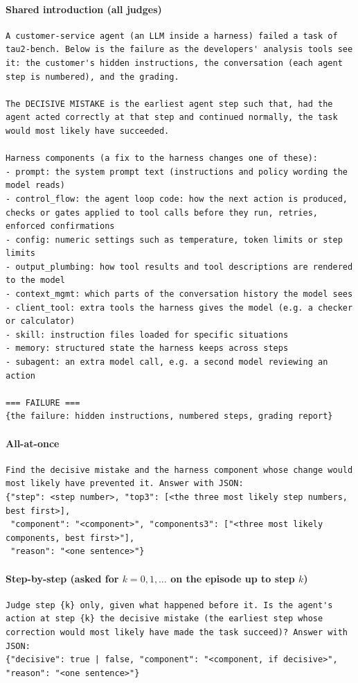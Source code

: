 \paragraph{Shared introduction (all judges)}
\begin{Verbatim}[fontsize=\scriptsize, breaklines, breakanywhere]
A customer-service agent (an LLM inside a harness) failed a task of tau2-bench. Below is the failure as the developers' analysis tools see it: the customer's hidden instructions, the conversation (each agent step is numbered), and the grading.

The DECISIVE MISTAKE is the earliest agent step such that, had the agent acted correctly at that step and continued normally, the task would most likely have succeeded.

Harness components (a fix to the harness changes one of these):
- prompt: the system prompt text (instructions and policy wording the model reads)
- control_flow: the agent loop code: how the next action is produced, checks or gates applied to tool calls before they run, retries, enforced confirmations
- config: numeric settings such as temperature, token limits or step limits
- output_plumbing: how tool results and tool descriptions are rendered to the model
- context_mgmt: which parts of the conversation history the model sees
- client_tool: extra tools the harness gives the model (e.g. a checker or calculator)
- skill: instruction files loaded for specific situations
- memory: structured state the harness keeps across steps
- subagent: an extra model call, e.g. a second model reviewing an action

=== FAILURE ===
{the failure: hidden instructions, numbered steps, grading report}
\end{Verbatim}

\paragraph{All-at-once}
\begin{Verbatim}[fontsize=\scriptsize, breaklines, breakanywhere]
Find the decisive mistake and the harness component whose change would most likely have prevented it. Answer with JSON:
{"step": <step number>, "top3": [<the three most likely step numbers, best first>],
 "component": "<component>", "components3": ["<three most likely components, best first>"],
 "reason": "<one sentence>"}
\end{Verbatim}

\paragraph{Step-by-step (asked for $k=0,1,\dots$ on the episode up to step $k$)}
\begin{Verbatim}[fontsize=\scriptsize, breaklines, breakanywhere]
Judge step {k} only, given what happened before it. Is the agent's action at step {k} the decisive mistake (the earliest step whose correction would most likely have made the task succeed)? Answer with JSON:
{"decisive": true | false, "component": "<component, if decisive>", "reason": "<one sentence>"}
\end{Verbatim}


